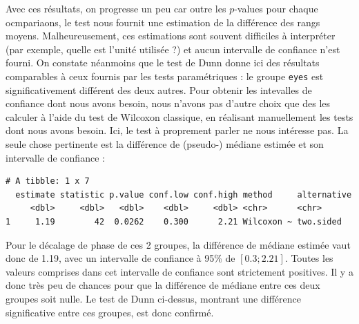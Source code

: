 \documentclass[a4paperpaper,]{article}
\newenvironment{Shaded}{\begin{snugshade}}{\end{snugshade}}
\newcommand{\CommentTok}[1]{\textcolor[rgb]{0.54,0.53,0.53}{#1}}
\newcommand{\DataTypeTok}[1]{\textcolor[rgb]{0.00,0.34,0.68}{#1}}
\newcommand{\KeywordTok}[1]{\textcolor[rgb]{0.12,0.11,0.11}{\textbf{#1}}}
\newcommand{\NormalTok}[1]{\textcolor[rgb]{0.12,0.11,0.11}{#1}}
\newcommand{\OperatorTok}[1]{\textcolor[rgb]{0.12,0.11,0.11}{#1}}
\newcommand{\OtherTok}[1]{\textcolor[rgb]{0.00,0.43,0.16}{#1}}
\newcommand{\StringTok}[1]{\textcolor[rgb]{0.75,0.01,0.01}{#1}}
\begin{document}
Avec ces résultats, on progresse un peu car outre les \(p\)-values pour chaque ocmpariaons, le test nous fournit une estimation de la différence des rangs moyens. Malheureusement, ces estimations sont souvent difficiles à interpréter (par exemple, quelle est l'unité utilisée ?) et aucun intervalle de confiance n'est fourni. On constate néanmoins que le test de Dunn donne ici des résultats comparables à ceux fournis par les tests paramétriques : le groupe \texttt{eyes} est significativement différent des deux autres. Pour obtenir les intevalles de confiance dont nous avons besoin, nous n'avons pas d'autre choix que des les calculer à l'aide du test de Wilcoxon classique, en réalisant manuellement les tests dont nous avons besoin. Ici, le test à proprement parler ne nous intéresse pas. La seule chose pertinente est la différence de (pseudo-) médiane estimée et son intervalle de confiance :

\begin{Shaded}
\end{Shaded}

\begin{verbatim}
# A tibble: 1 x 7
  estimate statistic p.value conf.low conf.high method     alternative
     <dbl>     <dbl>   <dbl>    <dbl>     <dbl> <chr>      <chr>      
1     1.19        42  0.0262    0.300      2.21 Wilcoxon ~ two.sided  
\end{verbatim}

Pour le décalage de phase de ces 2 groupes, la différence de médiane estimée vaut donc de 1.19, avec un intervalle de confiance à 95\% de \([0.3 ; 2.21]\). Toutes les valeurs comprises dans cet intervalle de confiance sont strictement positives. Il y a donc très peu de chances pour que la différence de médiane entre ces deux groupes soit nulle. Le test de Dunn ci-dessus, montrant une différence significative entre ces groupes, est donc confirmé.
\end{document}
